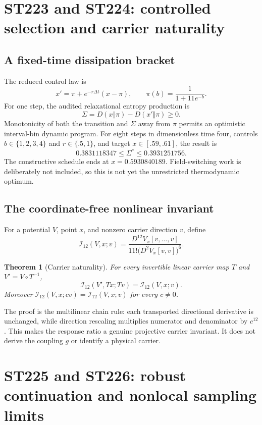 \documentclass[11pt,a4paper]{article}
\newtheorem{theorem}{Theorem}[section]
\begin{document}
\section{ST223 and ST224: controlled selection and carrier naturality}

\subsection{A fixed-time dissipation bracket}

The reduced control law is
\[
x' = \pi+e^{-r\Delta t}(x-\pi),\qquad
\pi(b)=\frac{1}{1+11e^{-b}}.
\]
For one step, the audited relaxational entropy production is
\[
\Sigma=D(x\Vert\pi)-D(x'\Vert\pi)\ge0.
\]
Monotonicity of both the transition and $\Sigma$ away from $\pi$ permits an optimistic
interval-bin dynamic program. For eight steps in dimensionless time four, controls
$b\in\{1,2,3,4\}$ and $r\in\{.5,1\}$, and target $x\in[.59,.61]$, the result is
\[
0.3831118347\le \Sigma^*\le0.3931251756.
\]
The constructive schedule ends at $x=0.5930840189$. Field-switching work is deliberately
not included, so this is not yet the unrestricted thermodynamic optimum.

\subsection{The coordinate-free nonlinear invariant}

For a potential $V$, point $x$, and nonzero carrier direction $v$, define
\[
\mathcal I_{12}(V,x;v)=
\frac{D^{12}V_x[v,\ldots,v]}{11!\bigl(D^2V_x[v,v]\bigr)^6}.
\]

\begin{theorem}[Carrier naturality]
For every invertible linear carrier map $T$ and $V'=V\circ T^{-1}$,
\[
\mathcal I_{12}(V',Tx;Tv)=\mathcal I_{12}(V,x;v).
\]
Moreover $\mathcal I_{12}(V,x;cv)=\mathcal I_{12}(V,x;v)$ for every $c\ne0$.
\end{theorem}

The proof is the multilinear chain rule: each transported directional derivative is
unchanged, while direction rescaling multiplies numerator and denominator by $c^{12}$.
This makes the response ratio a genuine projective carrier invariant. It does not derive
the coupling $g$ or identify a physical carrier.

\section{ST225 and ST226: robust continuation and nonlocal sampling limits}
\end{document}
